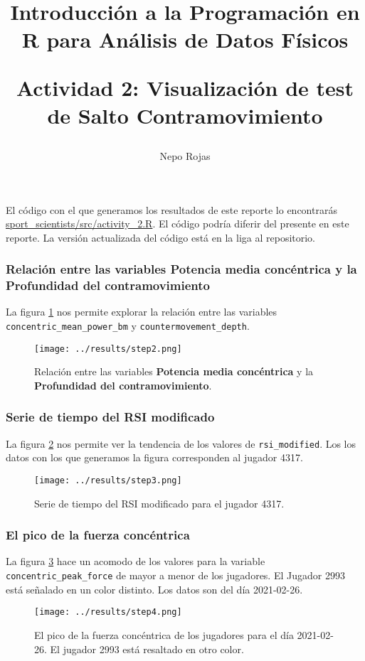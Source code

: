 

\author{Nepo Rojas}

\title{Introducción a la Programación en R para Análisis de Datos Físicos \\ \begin{large}
    Actividad 2: Visualización de test de Salto Contramovimiento \end{large}}



\maketitle

El código con el que generamos los resultados de este reporte lo encontrarás
\href{https://github.com/niesfutbol/sport_scientists/blob/develop/src/activity_2.R}{sport\_scientists/src/activity\_2.R}.
El código podría diferir del presente en este reporte. La versión actualizada del código está en la
liga al repositorio.

\subsubsection*{Relación entre las variables Potencia media concéntrica y la Profundidad del contramovimiento}
La figura \ref{fig:step2} nos permite explorar la relación entre las variables
\texttt{concentric\_mean\_power\_bm} y \texttt{countermovement\_depth}.
\begin{figure}[H]
\centering
\texttt{[image: ../results/step2.png]}
\caption{Relación entre las variables \textbf{Potencia media concéntrica} y la \textbf{Profundidad
del contramovimiento}.}
\label{fig:step2}
\end{figure}

\subsubsection*{Serie de tiempo del RSI modificado}
La figura \ref{fig:step3} nos permite ver la tendencia de los valores de \texttt{rsi\_modified}. Los
los datos con los que generamos la figura corresponden al jugador 4317.
\begin{figure}[H]
\centering
\texttt{[image: ../results/step3.png]}
\caption{Serie de tiempo del RSI modificado para el jugador 4317.}
\label{fig:step3}
\end{figure}
\subsubsection*{El pico de la fuerza concéntrica}
La figura \ref{fig:step4} hace un acomodo de los valores para la variable \texttt{concentric\_peak\_force}
de mayor a menor de los jugadores. El Jugador 2993 está señalado en un color distinto. Los datos
son del día 2021-02-26.
\begin{figure}[H]
\centering
\texttt{[image: ../results/step4.png]}
\caption{El pico de la fuerza concéntrica de los jugadores para el día 2021-02-26. El jugador 2993 está resaltado en otro color.}
\label{fig:step4}
\end{figure}

